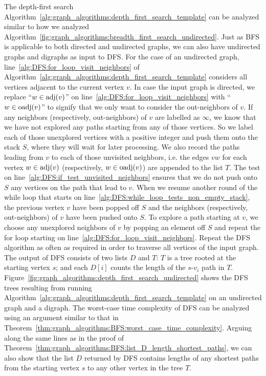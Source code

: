 The depth-first search
Algorithm~\ref{alg:graph_algorithms:depth_first_search_template} can
be analyzed similar to how we analyzed
Algorithm~\ref{fig:graph_algorithms:breadth_first_search_undirected}. Just
as BFS is applicable to both directed and undirected
graphs, we can also have undirected graphs and digraphs as input to
DFS. For the case of an undirected graph,
line~\ref{alg:DFS:for_loop_visit_neighbors} of
Algorithm~\ref{alg:graph_algorithms:depth_first_search_template}
considers all vertices adjacent to the current vertex $v$. In case the
input graph is directed, we replace ``$w \in \operatorname*{adj}(v)$'' on
line~\ref{alg:DFS:for_loop_visit_neighbors} with ``$w \in \operatorname*{oadj}(v)$''
to signify that we only want to consider the
out-neighbors of $v$. If any neighbors
(respectively, out-neighbors) of $v$ are labelled
as $\infty$, we know that we have not explored any paths starting from
any of those vertices. So we label each of those unexplored vertices
with a positive integer and push them onto the stack $S$,
where they will wait for later processing. We also record the paths
leading from $v$ to each of those unvisited neighbors, i.e. the edges
$vw$ for each vertex $w \in \operatorname*{adj}(v)$ (respectively, $w \in \operatorname*{oadj}(v)$)
are appended to the list $T$. The test on
line~\ref{alg:DFS:if_test_unvisited_neighbors} ensures that we do not
push onto $S$ any vertices on the path that lead to $v$. When we
resume another round of the while loop that starts on
line~\ref{alg:DFS:while_loop_tests_non_empty_stack}, the previous
vertex $v$ have been popped off $S$ and the neighbors
(respectively, out-neighbors) of $v$ have been
pushed onto $S$. To explore a path starting at $v$,
we choose any unexplored neighbors of $v$ by popping an element off
$S$ and repeat the for loop starting on
line~\ref{alg:DFS:for_loop_visit_neighbors}. Repeat the DFS
algorithm as often as required in order to traverse all vertices of
the input graph. The output of DFS consists of two lists
$D$ and $T$: $T$ is a tree rooted at the starting
vertex $s$; and each $D[i]$ counts the length of the $s$-$v_i$ path in
$T$. Figure~\ref{fig:graph_algorithms:depth_first_search_undirected}
shows the DFS trees
resulting from running
Algorithm~\ref{alg:graph_algorithms:depth_first_search_template} on an
undirected graph and a digraph. The worst-case time complexity of
DFS can be analyzed using an argument similar to that in
Theorem~\ref{thm:graph_algorithms:BFS:worst_case_time_complexity}. Arguing
along the same lines as in the proof of
Theorem~\ref{thm:graph_algorithms:BFS:list_D_length_shortest_paths},
we can also show that the list $D$ returned by DFS contains
lengths of any shortest paths from the starting vertex $s$ to any
other vertex in the tree $T$.

